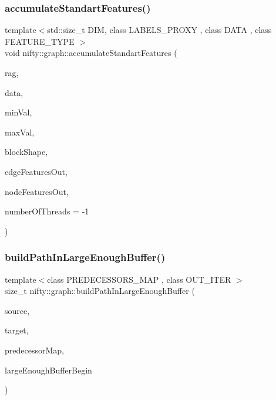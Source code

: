 \subsubsection{\texorpdfstring{accumulate\+Standart\+Features()}{accumulateStandartFeatures()}}
{\footnotesize\ttfamily template$<$std\+::size\+\_\+t D\+IM, class L\+A\+B\+E\+L\+S\+\_\+\+P\+R\+O\+XY , class D\+A\+TA , class F\+E\+A\+T\+U\+R\+E\+\_\+\+T\+Y\+PE $>$ \\
void nifty\+::graph\+::accumulate\+Standart\+Features (\begin{DoxyParamCaption}\item[{const \hyperlink{classnifty_1_1graph_1_1GridRag}{Grid\+Rag}$<$ D\+IM, L\+A\+B\+E\+L\+S\+\_\+\+P\+R\+O\+XY $>$ \&}]{rag,  }\item[{const D\+A\+TA \&}]{data,  }\item[{const double}]{min\+Val,  }\item[{const double}]{max\+Val,  }\item[{const \hyperlink{namespacenifty_1_1array_a683f151f19c851754e0c6d55ed16a0c2}{array\+::\+Static\+Array}$<$ int64\+\_\+t, D\+IM $>$ \&}]{block\+Shape,  }\item[{\hyperlink{classandres_1_1View}{marray\+::\+View}$<$ F\+E\+A\+T\+U\+R\+E\+\_\+\+T\+Y\+PE $>$ \&}]{edge\+Features\+Out,  }\item[{\hyperlink{classandres_1_1View}{marray\+::\+View}$<$ F\+E\+A\+T\+U\+R\+E\+\_\+\+T\+Y\+PE $>$ \&}]{node\+Features\+Out,  }\item[{const int}]{number\+Of\+Threads = {\ttfamily -\/1} }\end{DoxyParamCaption})}

\mbox{\label{namespacenifty_1_1graph_ad5fff1c63a572469a352e1645f9d3d0c}} 
\subsubsection{\texorpdfstring{build\+Path\+In\+Large\+Enough\+Buffer()}{buildPathInLargeEnoughBuffer()}}
{\footnotesize\ttfamily template$<$class P\+R\+E\+D\+E\+C\+E\+S\+S\+O\+R\+S\+\_\+\+M\+AP , class O\+U\+T\+\_\+\+I\+T\+ER $>$ \\
size\+\_\+t nifty\+::graph\+::build\+Path\+In\+Large\+Enough\+Buffer (\begin{DoxyParamCaption}\item[{const uint64\+\_\+t}]{source,  }\item[{const uint64\+\_\+t}]{target,  }\item[{const P\+R\+E\+D\+E\+C\+E\+S\+S\+O\+R\+S\+\_\+\+M\+AP \&}]{predecessor\+Map,  }\item[{O\+U\+T\+\_\+\+I\+T\+ER}]{large\+Enough\+Buffer\+Begin }\end{DoxyParamCaption})}

